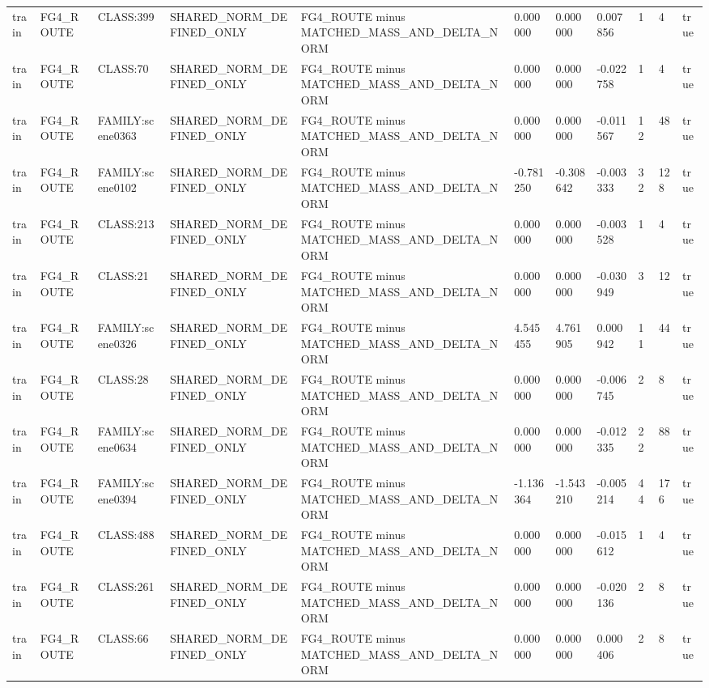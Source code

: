 \begin{tabular}{lllllllllll}
train & FG4\_ROUTE & CLASS:399 & SHARED\_NORM\_DEFINED\_ONLY & FG4\_ROUTE minus MATCHED\_MASS\_AND\_DELTA\_NORM & 0.000000 & 0.000000 & 0.007856 & 1 & 4 & true \\
train & FG4\_ROUTE & CLASS:70 & SHARED\_NORM\_DEFINED\_ONLY & FG4\_ROUTE minus MATCHED\_MASS\_AND\_DELTA\_NORM & 0.000000 & 0.000000 & -0.022758 & 1 & 4 & true \\
train & FG4\_ROUTE & FAMILY:scene0363 & SHARED\_NORM\_DEFINED\_ONLY & FG4\_ROUTE minus MATCHED\_MASS\_AND\_DELTA\_NORM & 0.000000 & 0.000000 & -0.011567 & 12 & 48 & true \\
train & FG4\_ROUTE & FAMILY:scene0102 & SHARED\_NORM\_DEFINED\_ONLY & FG4\_ROUTE minus MATCHED\_MASS\_AND\_DELTA\_NORM & -0.781250 & -0.308642 & -0.003333 & 32 & 128 & true \\
train & FG4\_ROUTE & CLASS:213 & SHARED\_NORM\_DEFINED\_ONLY & FG4\_ROUTE minus MATCHED\_MASS\_AND\_DELTA\_NORM & 0.000000 & 0.000000 & -0.003528 & 1 & 4 & true \\
train & FG4\_ROUTE & CLASS:21 & SHARED\_NORM\_DEFINED\_ONLY & FG4\_ROUTE minus MATCHED\_MASS\_AND\_DELTA\_NORM & 0.000000 & 0.000000 & -0.030949 & 3 & 12 & true \\
train & FG4\_ROUTE & FAMILY:scene0326 & SHARED\_NORM\_DEFINED\_ONLY & FG4\_ROUTE minus MATCHED\_MASS\_AND\_DELTA\_NORM & 4.545455 & 4.761905 & 0.000942 & 11 & 44 & true \\
train & FG4\_ROUTE & CLASS:28 & SHARED\_NORM\_DEFINED\_ONLY & FG4\_ROUTE minus MATCHED\_MASS\_AND\_DELTA\_NORM & 0.000000 & 0.000000 & -0.006745 & 2 & 8 & true \\
train & FG4\_ROUTE & FAMILY:scene0634 & SHARED\_NORM\_DEFINED\_ONLY & FG4\_ROUTE minus MATCHED\_MASS\_AND\_DELTA\_NORM & 0.000000 & 0.000000 & -0.012335 & 22 & 88 & true \\
train & FG4\_ROUTE & FAMILY:scene0394 & SHARED\_NORM\_DEFINED\_ONLY & FG4\_ROUTE minus MATCHED\_MASS\_AND\_DELTA\_NORM & -1.136364 & -1.543210 & -0.005214 & 44 & 176 & true \\
train & FG4\_ROUTE & CLASS:488 & SHARED\_NORM\_DEFINED\_ONLY & FG4\_ROUTE minus MATCHED\_MASS\_AND\_DELTA\_NORM & 0.000000 & 0.000000 & -0.015612 & 1 & 4 & true \\
train & FG4\_ROUTE & CLASS:261 & SHARED\_NORM\_DEFINED\_ONLY & FG4\_ROUTE minus MATCHED\_MASS\_AND\_DELTA\_NORM & 0.000000 & 0.000000 & -0.020136 & 2 & 8 & true \\
train & FG4\_ROUTE & CLASS:66 & SHARED\_NORM\_DEFINED\_ONLY & FG4\_ROUTE minus MATCHED\_MASS\_AND\_DELTA\_NORM & 0.000000 & 0.000000 & 0.000406 & 2 & 8 & true \\

\end{tabular}
